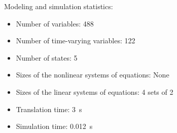 \begin{contextbox}
  Modeling and simulation statistics:
  \begin{itemize}
    \item Number of variables: 488
    \item Number of time-varying variables: 122
    \item Number of states: 5
    \item Sizes of the nonlinear systems of equations: None
    \item Sizes of the linear systems of equations: 4 sets of 2
    \item Translation time: \SI{3}{s}
    \item Simulation time: \SI{0.012}{s}
  \end{itemize}
\end{contextbox}